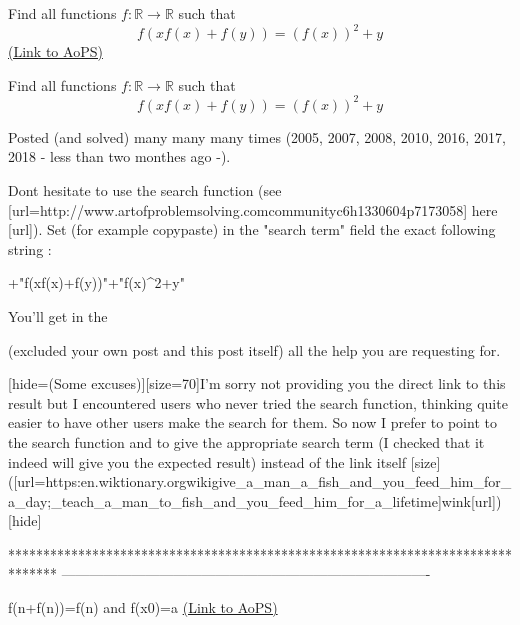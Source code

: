 \begin{problem}
	Find all functions $f: \mathbb{R} \to \mathbb{R}$ such that
\[f(xf(x) + f(y)) = \left ( f(x) \right )^2 + y\]
	\flushright \href{https://artofproblemsolving.com/community/c6h1603339}{(Link to AoPS)}
\end{problem}



\begin{solution}
	\begin{tcolorbox}Find all functions $f: \mathbb{R} \to \mathbb{R}$ such that
\[f(xf(x) + f(y)) = \left ( f(x) \right )^2 + y\]\end{tcolorbox}
Posted (and solved) many many many times (2005, 2007, 2008, 2010, 2016, 2017, 2018 - less than two monthes ago -).

Dont hesitate to use the search function (see [url=http://www.artofproblemsolving.com\/community\/c6h1330604p7173058] here [\/url]).
Set (for example copy\/paste) in the "search term" field the exact following string : 

+"f(xf(x)+f(y))"+"f(x)^2+y"

You'll get in the  (excluded your own post and this post itself) all the help you are requesting for.

[hide=(Some excuses)][size=70]I'm sorry not providing you the direct link to this result but I encountered users who never tried the search function, thinking quite easier to have other users make the search for them. So now I prefer to point to the search function and to give the appropriate search term (I checked that it indeed will give you the expected result) instead of the link itself [\/size]([url=https:\/\/en.wiktionary.org\/wiki\/give_a_man_a_fish_and_you_feed_him_for_a_day;_teach_a_man_to_fish_and_you_feed_him_for_a_lifetime]wink[\/url])[\/hide]





\end{solution}
*******************************************************************************
-------------------------------------------------------------------------------

\begin{problem}
	f(n+f(n))=f(n) and f(x0)=a
	\flushright \href{https://artofproblemsolving.com/community/c6h1604376}{(Link to AoPS)}
\end{problem}



